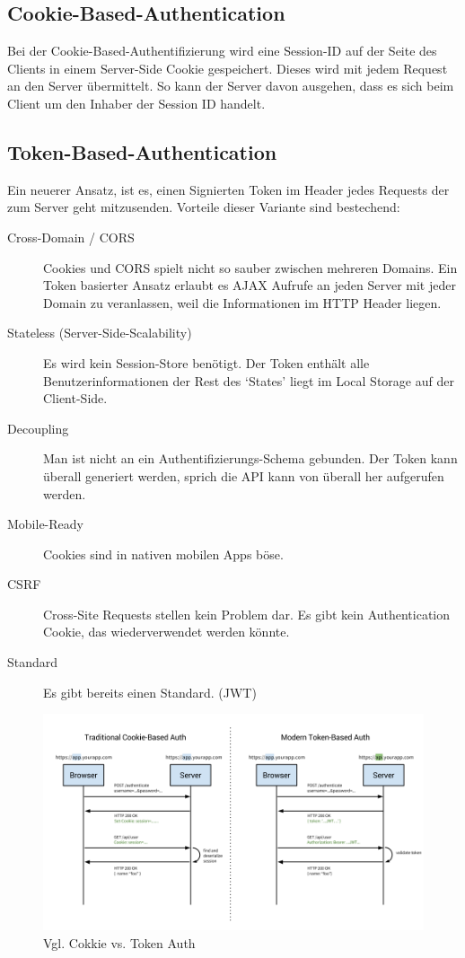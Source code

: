 \subsection{Cookie-Based-Authentication}
Bei der Cookie-Based-Authentifizierung wird eine Session-ID auf der Seite des Clients in einem Server-Side Cookie gespeichert. Dieses wird mit jedem Request an den Server übermittelt. So kann der Server davon ausgehen, dass es sich beim Client um den Inhaber der Session ID handelt.

\subsection{Token-Based-Authentication}
Ein neuerer Ansatz, ist es, einen Signierten Token im Header jedes Requests der zum Server geht mitzusenden. Vorteile dieser Variante sind bestechend:
\begin{description}
  \item[Cross-Domain / CORS]
  Cookies und CORS spielt nicht so sauber zwischen mehreren Domains. Ein Token basierter Ansatz erlaubt es AJAX Aufrufe an jeden Server mit jeder Domain zu veranlassen, weil die Informationen im HTTP Header liegen.
  \item[Stateless (Server-Side-Scalability)]Es wird kein Session-Store benötigt. Der Token enthält alle Benutzerinformationen der Rest des `States' liegt im Local Storage auf der Client-Side.
  \item[Decoupling] Man ist nicht an ein Authentifizierungs-Schema gebunden. Der Token kann überall generiert werden, sprich die API kann von überall her aufgerufen werden.
  \item[Mobile-Ready]Cookies sind in nativen mobilen Apps böse.
  \item[CSRF]Cross-Site Requests stellen kein Problem dar. Es gibt kein Authentication Cookie, das wiederverwendet werden könnte.
  \item[Standard]Es gibt bereits einen Standard. (\gls{JWT})
\end{description}
\begin{figure}[H]
    \centering
    \includegraphics[width=\linewidth]{fig/cookie-token-auth}
    \caption{Vgl. Cokkie vs. Token Auth}
    \label{fig:pd:cookie-token-auth}
\end{figure}

